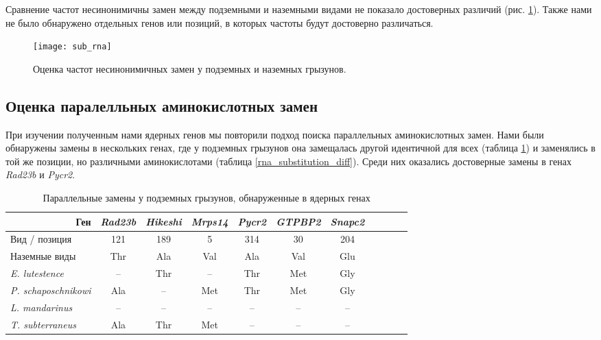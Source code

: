 Сравнение частот несинонимичны замен между подземными и наземными видами не показало достоверных различий (рис. \ref{sub_RNA}). Также нами не было обнаружено отдельных генов  или позиций, в которых частоты будут достоверно различаться. 

\begin{figure}[h!]
	\begin{center}
		\texttt{[image: sub\_rna]}
	\end{center}
	\caption{Оценка частот несинонимичных замен у подземных и наземных грызунов.}\label{sub_RNA}
\end{figure}

\subsection{Оценка паралелльных аминокислотных замен}

При изучении полученным нами ядерных генов мы повторили подход поиска параллельных аминокислотных замен. Нами были обнаружены замены в нескольких генах, где у подземных грызунов она замещалась другой идентичной для всех (таблица \ref{rna_substitution_all}) и заменялись в той же позиции, но различными аминокислотами (таблица \ref{rna_substitution_diff}). Среди них оказались достоверные замены в генах \textit{Rad23b} и \textit{Pycr2}. 

\begin{table}[]
	\caption{Параллельные замены у подземных грызунов, обнаруженные в ядерных генах}\label{rna_substitution_all} \vspace{5mm}
	
	\begin{center}
	\begin{tabular}{|l|c|c|c|c|c|c|c|c|c|c}
		\hline
		\multicolumn{1}{|r|}{Ген} & \textit{Rad23b} & \textit{Hikeshi} & \textit{Mrps14} & \textit{Pycr2} & \textit{GTPBP2} & \textit{Snapc2} \\ \hline
		Вид   / позиция & 121 & 189 & 5 & 314 & 30 & 204  \\ \hline
		Наземные виды &  Thr & Ala & Val & Ala & Val & Glu  \\ \hline
		\textit{E. lutestence}  & -- & Thr & -- & Thr  & Met & Gly  \\ \hline
		\textit{P. schaposchnikowi}  & Ala & -- & Met & Thr & Met & Gly  \\ \hline
		\textit{L. mandarinus}  & -- & -- & -- & --  & -- & --  \\ \hline
		\textit{T. subterraneus} & Ala & Thr  & Met & -- & -- & -- \\ \hline
	\end{tabular}
\end{center}
\end{table}


